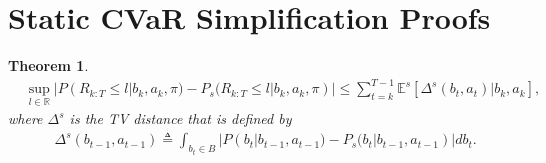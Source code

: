 \documentclass[acmlarge, manuscript, screen, review, natbib=false, oneside]{acmart}
\newtheorem{theorem}{Theorem}[section]
\begin{document}
\section{Static CVaR Simplification Proofs}

\begin{theorem}\label{prf:simplification_bound_over_belief_distribution}
	\begin{equation}
		\begin{aligned}
			&\sup_{l\in \mathbb{R}}|P(R_{k:T} \leq l|b_k, a_k,\pi) \! -\! P_s(R_{k:T} \leq l|b_k, a_k,\pi)| \!
			\leq \!\! \! \sum_{t=k}^{T-1} \mathbb{E}^s[\Delta^s(b_t, a_t)|b_k, a_k],
		\end{aligned}
	\end{equation}
	where $\Delta^s$ is the TV distance that is defined by
	\begin{equation}
		\begin{aligned}
			&\Delta^s(b_{t-1},a_{t-1}) \triangleq 
			\int_{b_t\in B} |P(b_t|b_{t-1},a_{t-1})-P_s(b_t|b_{t-1},a_{t-1})|db_t.
		\end{aligned}
	\end{equation}
	
\end{theorem}
\end{document}
